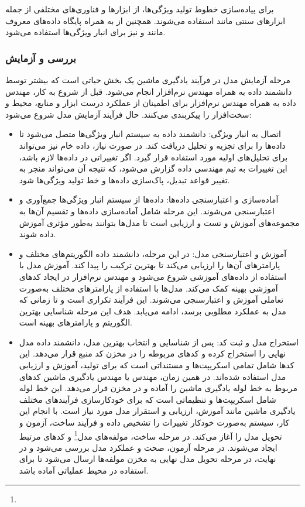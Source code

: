 برای پیاده‌سازی خطوط تولید ویژگی‌ها، از ابزارها و فناوری‌های مختلفی از جمله ابزارهای  سنتی مانند  استفاده می‌شوند. همچنین از  به همراه پایگاه داده‌های معروف مانند  و  نیز برای انبار ویژگی‌ها استفاده می‌شود.

\subsubsection{بررسی و آزمایش}
مرحله آزمایش مدل در فرآیند یادگیری ماشین یک بخش حیاتی است که بیشتر توسط دانشمند داده به همراه مهندس نرم‌افزار انجام می‌شود. قبل از شروع به کار، مهندس داده به همراه مهندس نرم‌افزار برای اطمینان از عملکرد درست ابزار و منابع، محیط و سخت‌افزار را پیکربندی می‌کنند. حال فرآیند آزمایش مدل شروع می‌شود:
\begin{itemize}
	\item 
	اتصال به انبار ویژگی:
	دانشمند داده به سیستم انبار ویژگی‌ها متصل می‌شود تا داده‌ها را برای تجزیه و تحلیل دریافت کند. در صورت نیاز، داده خام نیز می‌تواند برای تحلیل‌های اولیه مورد استفاده قرار گیرد. اگر تغییراتی در داده‌ها لازم باشد، این تغییرات به تیم مهندسی داده گزارش می‌شود، که نتیجه آن می‌تواند منجر به تغییر قواعد تبدیل، پاک‌سازی داده‌ها و خط تولید ویژگی‌ها شود.
	\item 
	آماده‌سازی و اعتبارسنجی داده‌ها:
	داده‌ها از سیستم انبار ویژگی‌ها جمع‌آوری و اعتبارسنجی می‌شوند. این مرحله شامل آماده‌سازی داده‌ها و تقسیم آن‌ها به مجموعه‌های آموزش و تست و ارزیابی است تا مدل‌ها بتوانند به‌طور مؤثری آموزش داده شوند.
	\item 
	آموزش و اعتبارسنجی مدل:
	در این مرحله، دانشمند داده الگوریتم‌های مختلف و پارامترهای آن‌ها را ارزیابی می‌کند تا بهترین ترکیب را پیدا کند. آموزش مدل با استفاده از داده‌های آموزشی شروع می‌شود و مهندس نرم‌افزار در ایجاد کدهای آموزشی بهینه کمک می‌کند. مدل‌ها با استفاده از پارامترهای مختلف به‌صورت تعاملی آموزش و اعتبارسنجی می‌شوند. این فرآیند تکراری است و تا زمانی که مدل به عملکرد مطلوبی برسد، ادامه می‌یابد. هدف این مرحله شناسایی بهترین الگوریتم و پارامترهای بهینه است.
	\item 
	استخراج مدل و ثبت کد:
	پس از شناسایی و انتخاب بهترین مدل، دانشمند داده مدل نهایی را استخراج کرده و کدهای مربوطه را در مخزن کد منبع قرار می‌دهد. این کدها شامل تمامی اسکریپت‌ها و مستنداتی است که برای تولید، آموزش و ارزیابی مدل استفاده شده‌اند. در همین زمان، مهندس  یا مهندس یادگیری ماشین کدهای مربوط به خط لوله یادگیری ماشین را آماده و در مخزن قرار می‌دهد. این خط لوله شامل اسکریپت‌ها و تنظیماتی است که برای خودکارسازی فرآیندهای مختلف یادگیری ماشین مانند آموزش، ارزیابی و استقرار مدل مورد نیاز است. با انجام این کار، سیستم  به‌صورت خودکار تغییرات را تشخیص داده و فرآیند ساخت، آزمون و تحویل مدل را آغاز می‌کند. در مرحله ساخت، مولفه‌های مدل\footnote{} و کدهای مرتبط ایجاد می‌شوند. در مرحله آزمون، صحت و عملکرد مدل بررسی می‌شود و در نهایت، در مرحله تحویل مدل نهایی به مخزن مولفه‌ها ارسال می‌شود تا برای استفاده در محیط عملیاتی آماده باشد.
\end{itemize}

